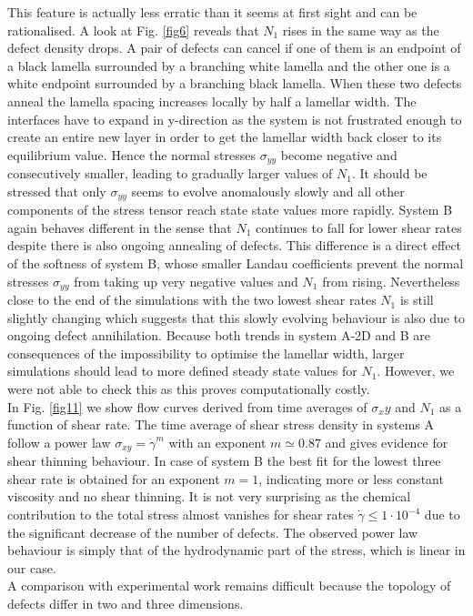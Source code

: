 \documentclass[8.5pt,twoside,twocolumn]{article}
\newcommand{\e}[1]{\cdot10^{#1}}
\begin{document}
This feature is actually less erratic than it seems at first sight and can be rationalised. 
A look at Fig. \ref{fig6} reveals that $N_1$ rises in the same way as the defect density drops.
A pair of defects can cancel if one of them is an endpoint of a black lamella surrounded by a branching white lamella and the other one is a white endpoint surrounded by a branching black lamella.
When these two defects anneal the lamella spacing increases locally by half a lamellar width.
The interfaces have to expand in y-direction as the system is not frustrated enough to create an entire new layer in order to get the lamellar width back closer to its equilibrium value.
Hence the normal stresses $\sigma_{yy}$ become negative and consecutively smaller, leading to gradually larger values of $N_1$.
It should be stressed that only $\sigma_{yy}$ seems to evolve anomalously slowly and all other components of the stress tensor reach state state values more rapidly.
System B again behaves different in the sense that $N_1$ continues to fall for lower shear rates despite there is also ongoing annealing of defects.
This difference is a direct effect of the softness of system B, whose smaller Landau coefficients prevent the normal stresses $\sigma_{yy}$ from taking up very negative values and $N_1$ from rising.
Nevertheless close to the end of the simulations with the two lowest shear rates $N_1$ is still slightly changing which suggests that this slowly evolving behaviour is also due to ongoing defect annihilation.
Because both trends in system A-2D and B are consequences of the impossibility to optimise the lamellar width, larger simulations should lead to more defined steady state values for $N_1$.
However, we were not able to check this as this proves computationally costly.\\
In Fig. \ref{fig11} we show flow curves derived from time averages of $\sigma_xy$ and $N_1$ as a function of shear rate.
The time average of shear stress density in systems A follow a power law $\sigma_{xy}=\dot{\gamma}^m$ with an exponent $m\simeq 0.87$ and gives evidence for shear thinning behaviour.
In case of system B the best fit for the lowest three shear rate is obtained for an exponent $m=1$, indicating more or less constant viscosity and no shear thinning.
It is not very surprising as the chemical contribution to the total stress almost vanishes for shear rates $\dot{\gamma}\le1\e{-4}$ due to the significant decrease of the number of defects.
The observed power law behaviour is simply that of the hydrodynamic part of the stress, which is linear in our case.\\
A comparison with experimental work remains difficult because the topology of defects differ in two and three dimensions.
\end{document}
